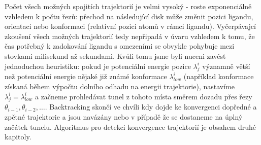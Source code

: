 Počet všech možných spojitích trajektorií je velmi vysoký - roste exponenciálně vzhledem
k počtu řezů: přechod na následující disk může změnit pozici ligandu, orientaci
nebo konformaci (relativní pozici atomů v rámci ligandu). Vyčerpávajcí zkoušení
všech možných trajektorií tedy nepřipadá v úvaru vzhledem k tomu, že čas
potřebný k zadokování ligandu s omezeními se obvykle pohybuje mezi stovkami
milisekund až sekundami. Kvůli tomu jsme byli nuceni zavést jednoduchou heuristiku:
pokud je potenciální energie pozice $ \lambda^i_j $ významně větší než potenciální
energie nějaké již známé konformace $ \lambda^i_{low} $ (například konformace
získaná během výpočtu dolního odhadu na energii trajektorie), nastavíme
$ \lambda^i_j = \lambda^i_{low} $ a začneme prohledávat tunel z tohoto místa
směrem dozadu přes řezy $ \theta_{i-1}, \theta_{i-2}, \dots $. Backtracking
skončí ve chvíli kdy dojde ke konvergenci dopředné a zpětné trajektorie a jsou
navázány nebo v případě že se dostaneme na úplný začátek tunelu.
Algoritmus pro detekci konvergence trajektorií je obsahem druhé kapitoly.

